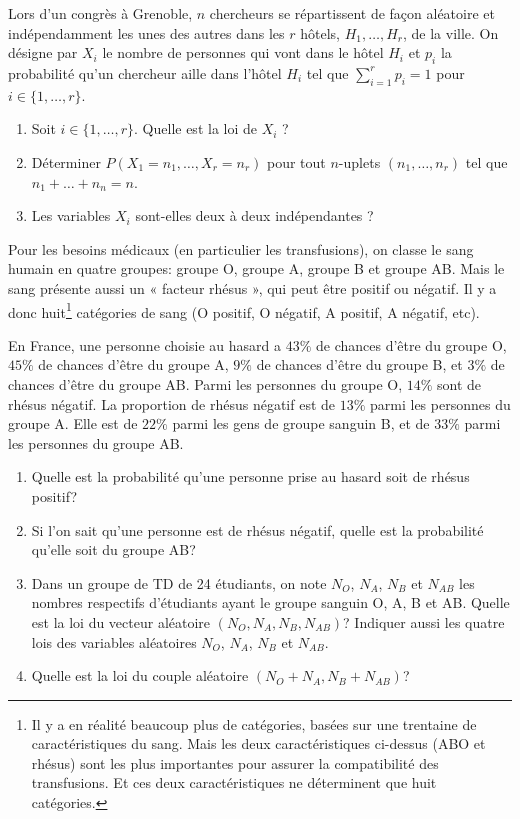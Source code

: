 \documentclass[a4paper,12pt,reqno]{amsart}
\begin{document}
\begin{exo}

  Lors d'un congrès à Grenoble, $n$ chercheurs se répartissent de façon aléatoire et indépendamment les unes des autres  dans les $r$ hôtels, $H_1,\ldots,H_r$, de la ville. On désigne par $X_i$ le nombre de personnes qui vont dans le hôtel $H_i$ et $p_i$ la probabilité qu'un chercheur aille dans l'hôtel $H_i$ tel que $\sum_{i=1}^rp_i=1$ pour $i\in\{1,\ldots,r\}$.
  \begin{enumerate}
    \item Soit $i\in\{1,\ldots,r\}$. Quelle est la loi de $X_i$ ?
    \item Déterminer  $P(X_1=n_1,\ldots,X_r=n_r)$ pour tout $n$-uplets $(n_1,\ldots,n_r)$ tel que $n_1+\ldots +n_n=n$.
    \item Les variables $X_i$ sont-elles deux à deux indépendantes ?
  \end{enumerate}

\end{exo}

\begin{exo}

  Pour les besoins médicaux (en particulier les transfusions), on classe le sang humain en quatre groupes: groupe O, groupe A, groupe B et groupe AB. Mais le sang présente aussi un « facteur rhésus », qui peut être positif ou négatif. Il y a donc huit\footnote{Il y a en réalité beaucoup plus de catégories, basées sur une trentaine de caractéristiques du sang. Mais les deux caractéristiques ci-dessus (ABO et rhésus) sont les plus importantes pour assurer la compatibilité des transfusions. Et ces deux caractéristiques ne déterminent que huit catégories.} catégories de sang (O positif, O négatif, A positif, A négatif, etc).

  En France, une personne choisie au hasard a $43\%$ de chances d'être du groupe O, $45\%$ de chances d'être du groupe A, $9\%$ de chances d'être du groupe B, et $3\%$ de chances d'être du groupe AB.
  Parmi les personnes du groupe O, $14\%$ sont de rhésus négatif. La proportion de rhésus négatif est de $13\%$ parmi les personnes du groupe A. Elle est de $22\%$ parmi les gens de groupe sanguin B, et de $33\%$ parmi les personnes du groupe AB.
  \begin{enumerate}
    \item Quelle est la probabilité qu'une personne prise au hasard soit de rhésus positif?
    \item Si l'on sait qu'une personne est de rhésus négatif, quelle est la probabilité qu'elle soit du groupe AB?
    \item Dans un groupe de TD de 24 étudiants, on note $N_O$, $N_A$, $N_B$ et $N_{AB}$ les nombres respectifs d'étudiants ayant le groupe sanguin O, A, B et AB. Quelle est la loi du vecteur aléatoire  $(N_O,N_A,N_B,N_{AB})$? Indiquer aussi les quatre lois des variables aléatoires $N_O$, $N_A$, $N_B$ et $N_{AB}$.
    \item Quelle est la loi du couple aléatoire $(N_O+N_A,N_B+N_{AB})$?
  \end{enumerate}
\end{exo}
\end{document}
